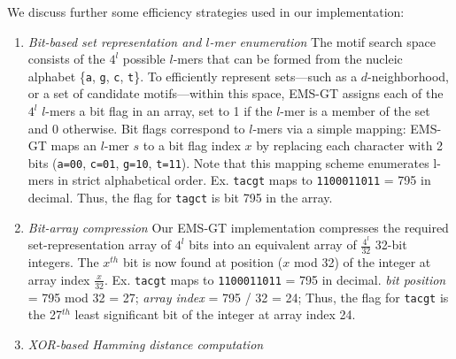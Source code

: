 \documentclass[conference]{IEEEtran}
\begin{document}
		We discuss further some efficiency strategies used in our implementation:
		\begin{enumerate}[label={\em \arabic*.}]
		\item{\em Bit-based set representation and $l$-mer enumeration}\newline
			The motif search space consists of the $4^{l}$ possible $l$-mers that can be formed from the nucleic alphabet \{\texttt{a}, \texttt{g}, \texttt{c}, \texttt{t}\}.
			To efficiently represent sets---such as a $d$-neighborhood, or a set of candidate motifs---within
			this space, EMS-GT assigns each of the $4^{l}$ $l$-mers a bit flag in an array,
			set to 1 if the $l$-mer is a member of the set and 0 otherwise.
			Bit flags correspond to $l$-mers via a simple mapping:
			EMS-GT maps an $l$-mer $s$ to a bit flag index $x$ by replacing each character with 2 bits 
			(\texttt{a=00}, \texttt{c=01}, \texttt{g=10}, \texttt{t=11}).
			Note that this mapping scheme enumerates l-mers in strict alphabetical order. \newline \newline
			{\small Ex. \texttt{tacgt} maps to \texttt{1100011011} = 795 in decimal. \newline
				\hspace*{18pt} Thus, the flag for \texttt{tagct} is bit 795 in the array.}
			\bigskip	
		\item{\em Bit-array compression}\newline
			Our EMS-GT implementation compresses the required set-representation array of $4^{l}$ bits into an equivalent array of $\frac{4^{l}}{32}$ 32-bit integers. The $x^{th}$ bit is now found at position ($x$ mod 32) of the integer at array index $\frac{x}{32}$. \newline \newline
			{\small Ex. \texttt{tacgt} maps to \texttt{1100011011} = 795 in decimal.\newline
				\hspace*{18pt} \emph{bit position} = 795 mod 32 = 27;\newline
				\hspace*{18pt} \emph{array index}  = 795 / 32 = 24;\newline
				\hspace*{18pt}Thus, the flag for \texttt{tacgt} is the 27$^{th}$ least significant bit\newline
				\hspace*{18pt} of the integer at array index 24.}
			\bigskip
		\item{\em XOR-based Hamming distance computation}\newline

\end{enumerate}
\end{document}
